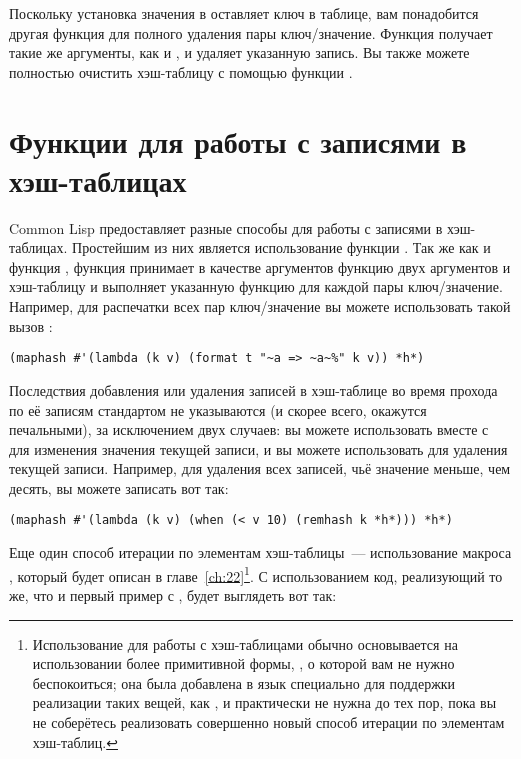 Поскольку установка значения в  оставляет ключ в таблице, вам понадобится другая
функция для полного удаления пары ключ/значение.  Функция  получает такие же
аргументы, как и , и удаляет указанную запись.  Вы также можете полностью
очистить хэш-таблицу с помощью функции .


\section{Функции для работы с записями в хэш-таблицах}

Common Lisp предоставляет разные способы для работы с записями в хэш-таблицах.  Простейшим
из них является использование функции .  Так же как и функция ,
функция  принимает в качестве аргументов функцию двух аргументов и
хэш-таблицу и выполняет указанную функцию для каждой пары ключ/значение.  Например, для
распечатки всех пар ключ/значение вы можете использовать такой вызов :

\begin{lstlisting}[style=lisprepl]
  (maphash #'(lambda (k v) (format t "~a => ~a~%" k v)) *h*)
\end{lstlisting}

Последствия добавления или удаления записей в хэш-таблице во время прохода по её записям
стандартом не указываются (и скорее всего, окажутся печальными), за исключением двух
случаев: вы можете использовать  вместе с  для изменения значения
текущей записи, и вы можете использовать  для удаления текущей записи.
Например, для удаления всех записей, чьё значение меньше, чем десять, вы можете записать
вот так:

\begin{lstlisting}[style=lisprepl]
  (maphash #'(lambda (k v) (when (< v 10) (remhash k *h*))) *h*)
\end{lstlisting}

Еще один способ итерации по элементам хэш-таблицы~--- использование макроса
, который будет описан в главе~\ref{ch:22}\footnote{Использование  для
  работы с хэш-таблицами обычно основывается на использовании более примитивной формы,
  , о которой вам не нужно беспокоиться; она была добавлена
  в язык специально для поддержки реализации таких вещей, как , и практически не
  нужна до тех пор, пока вы не соберётесь реализовать совершенно новый способ итерации по
  элементам хэш-таблиц.}.  С использованием  код, реализующий то же, что и первый
пример с , будет выглядеть вот так:


